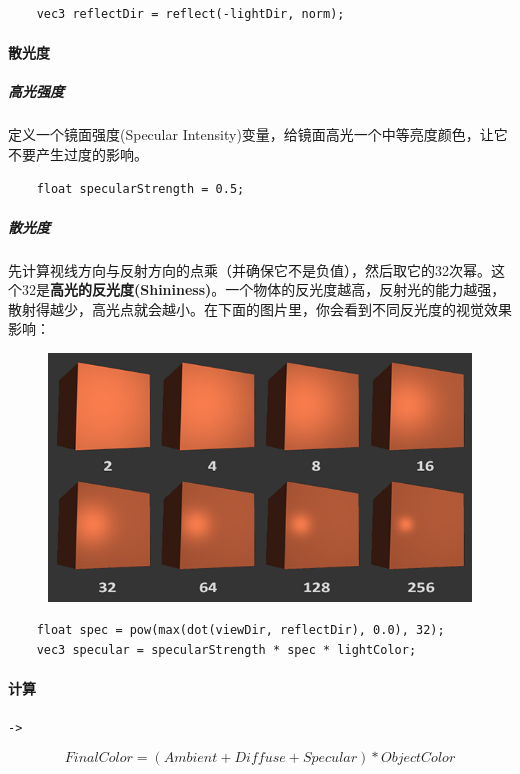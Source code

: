 \documentclass[UTF8,a4paper,12pt]{ctexbook}
\begin{document}
				\begin{lstlisting}
	vec3 reflectDir = reflect(-lightDir, norm);				
				\end{lstlisting}
			
			\paragraph{散光度}
				\subparagraph{高光强度}
					定义一个镜面强度(Specular Intensity)变量，给镜面高光一个中等亮度颜色，让它不要产生过度的影响。
					
					\begin{lstlisting}
	float specularStrength = 0.5;					
					\end{lstlisting}	
									
				\subparagraph{散光度}
					先计算视线方向与反射方向的点乘（并确保它不是负值），然后取它的32次幂。这个32是\textbf{高光的反光度(Shininess)}。一个物体的反光度越高，反射光的能力越强，散射得越少，高光点就会越小。在下面的图片里，你会看到不同反光度的视觉效果影响：
					\begin{figure}[H]
						\centering
						\includegraphics[width=.91\linewidth]{basic_lighting_specular_shininess}
					\end{figure}
					
					\begin{lstlisting}
	float spec = pow(max(dot(viewDir, reflectDir), 0.0), 32);
	vec3 specular = specularStrength * spec * lightColor;				
					\end{lstlisting}
			
			\paragraph{计算}\verb|->|
				
				$$FinalColor = (Ambient + Diffuse + Specular) * ObjectColor $$
				
\end{document}
